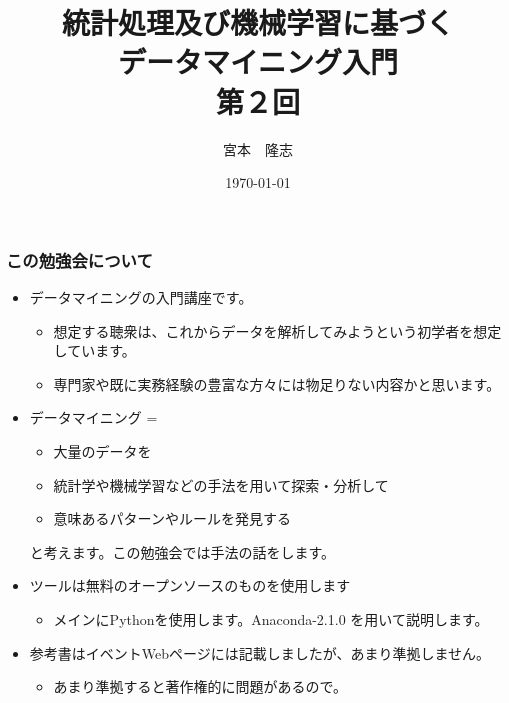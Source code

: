 \documentclass{beamer}
\title{統計処理及び機械学習に基づく\\データマイニング入門\\第２回}
\author{宮本　隆志}
\institute{ナビプラス株式会社}
\date{\today}
\begin{document}
\begin{frame}
  \titlepage
\end{frame}
\begin{frame}
  \frametitle{この勉強会について}
  \begin{itemize}
    \item データマイニングの入門講座です。
    \begin{itemize}
      \item 想定する聴衆は、これからデータを解析してみようという初学者を想定しています。
      \item 専門家や既に実務経験の豊富な方々には物足りない内容かと思います。
    \end{itemize}
    \item データマイニング = 
    \begin{itemize}
      \item 大量のデータを
      \item 統計学や機械学習などの手法を用いて探索・分析して
      \item 意味あるパターンやルールを発見する
    \end{itemize}
    と考えます。この勉強会では手法の話をします。
    \item ツールは無料のオープンソースのものを使用します
    \begin{itemize}
      \item メインにPythonを使用します。Anaconda-2.1.0 を用いて説明します。
    \end{itemize}
    \item 参考書はイベントWebページには記載しましたが、あまり準拠しません。
    \begin{itemize}
      \item あまり準拠すると著作権的に問題があるので。
    \end{itemize}
  \end{itemize}
\end{frame}
\end{document}
